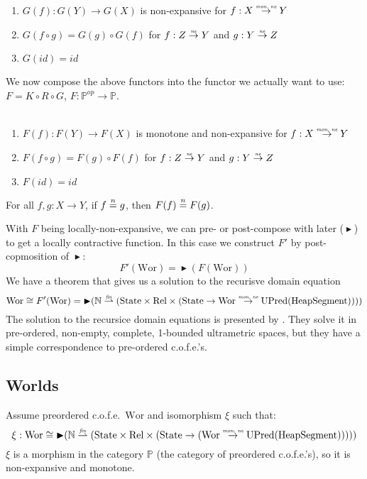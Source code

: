 \documentclass{article}
\newcommand{\forcenewline}{$\phantom{v}$\\}
\newcommand{\finparfun}{\stackrel{\textit{\tiny{fin}}}{\rightharpoonup}}
\newcommand{\monnefun}{\stackrel{\textit{\tiny{mon, ne}}}{\rightarrow}}
\newcommand{\nefun}{\stackrel{\textit{\tiny{ne}}}{\rightarrow}}
\newcommand{\fun}{\rightarrow}
\newcommand{\nequal}[1][n]{\stackrel{\tiny{#1}}{=}}
\newcommand{\blater}{\mathop{\blacktriangleright}}
\newcommand{\id}{\var{id}}
\newcommand{\cofe}{c.o.f.e.}
\newcommand{\cofes}{\cofe{}'s}
\newcommand{\CatP}{\mathbb{P}}
\newcommand{\var}[1]{\mathit{#1}}
\newcommand{\plaindom}[1]{\mathrm{#1}}
\newcommand{\HeapSegments}{\plaindom{HeapSegment}}
\newcommand{\nats}{\mathbb{N}}
\newcommand{\Rel}{\plaindom{Rel}}
\newcommand{\States}{\plaindom{State}}
\newcommand{\Wor}{\plaindom{Wor}}
\newcommand{\UPred}[1]{\plaindom{UPred}(#1)}
\begin{document}
\begin{lemma}[$G$ functorial]\forcenewline
\label{lem:G-func}
  \begin{enumerate}
  \item $G(f) : G(Y) \rightarrow G(X)$ is non-expansive for $f : X \monnefun Y$
  \item $G(f \circ g) = G(g) \circ G(f)$ for $f : Z \nefun Y$ and $g : Y \nefun Z$
  \item $G(\id) = \id$
  \end{enumerate}
\end{lemma}
We now compose the above functors into the functor we actually want to use: $F = K \circ R \circ G$, $F : \CatP^{\var{op}} \rightarrow \CatP$.
\begin{lemma}[$F$ functorial]\forcenewline
\label{lem:F-func}
  \begin{enumerate}
  \item $F(f) : F(Y) \rightarrow F(X)$ is monotone and non-expansive for $f : X \monnefun Y$
  \item $F(f \circ g) = F(g) \circ F(f)$ for $f : Z \nefun Y$ and $g : Y \nefun Z$\
  \item $F(\id) = \id$
  \end{enumerate}
\end{lemma}

\begin{lemma}
\label{lem:F-loc-ne}
For all $f, g : X \fun Y$, if $f \nequal g$, then $F(f) \nequal F(g)$.
\end{lemma}
With $F$ being locally-non-expansive, we can pre- or post-compose with later ($\blater$) to get a locally contractive function. In this case we construct $F'$ by post-copmosition of $\blater$:
\[
  F'(\Wor) = \blater (F(\Wor))
\]
We have a theorem that gives us a solution to the recurisve domain equation
\[
  \Wor \cong F'(\Wor) = \blater (\nats \finparfun (\States \times \Rel \times (\States \fun \Wor \monnefun \UPred{\HeapSegments} )))
\]
The solution to the recursice domain equations is presented by \cite{Birkedal:2010:TCS:411:4102-4122}. They solve it in pre-ordered, non-empty, complete, 1-bounded ultrametric spaces, but they have a simple correspondence to pre-ordered \cofes{}.

\subsection{Worlds}
\label{subsec:worlds}
Assume preordered \cofe{}\ $\Wor$ and isomorphism $\xi$ such that:
\[
  \xi : \Wor \cong \blater (\nats \finparfun (\States \times \Rel \times (\States \fun (\Wor \monnefun \UPred{\HeapSegments}))))
\]
$\xi$ is a morphism in the category $\CatP$ (the category of preordered \cofes{}), so it is non-expansive and monotone.
\end{document}
